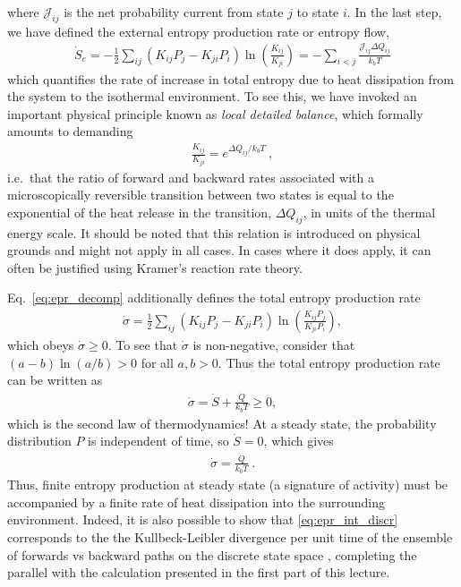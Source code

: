 %
where $\mathcal J_{ij}$ is the net probability current from state $j$ to state $i$.
In the last step, we have defined the external entropy production rate or entropy flow,
%
\begin{align}
    \dot S_e = - \frac{1}{2}\sum_{ij}
        ( K_{ij}P_j - K_{ji} P_i) 
    \ln \left( \frac{K_{ij}}{K_{ji}}\right) = - \sum_{i<j} \frac{\mathcal J_{ij} \Delta Q_{ij}}{k_b T}
\end{align}
%
which quantifies the rate of increase in total entropy due to heat dissipation from the system to the isothermal environment. To see this, we have invoked an important physical principle known as \emph{local detailed balance}, which formally amounts to demanding 
\begin{align}
    \frac{K_{ij}}{K_{ji}} = e^{\Delta Q_{ij} / k_b T}~,
\end{align}
i.e.\ that the ratio of forward and backward rates associated with a microscopically reversible transition between two states is equal to the exponential of the heat release in the transition, $\Delta Q_{ij}$, in units of the thermal energy scale. It should be noted that this relation is introduced on physical grounds and might not apply in all cases. In cases where it does apply, it can often be justified using Kramer's reaction rate theory.

Eq.~\eqref{eq:epr_decomp} additionally defines the total entropy production rate
%
\begin{align}
    \dot \sigma = 
    \frac{1}{2}\sum_{ij}
    \left(K_{ij}P_j - K_{ji} P_i\right) 
    \ln \left( \frac{K_{ij}P_j}{K_{ji} P_i}\right), \label{eq:epr_int_discr}
\end{align}
%
which obeys $\dot \sigma \geq 0$. To see that $\dot \sigma$ is non-negative, consider that $(a-b)\ln(a/b) > 0$ for all $a,b>0$.
Thus the total entropy production rate can be written as 
%
\begin{align}
    \dot \sigma = \dot S + \frac{\dot Q}{k_b T} \geq 0,
\end{align}
%
which is the second law of thermodynamics!
At a steady state, the probability distribution $P$ is independent of time, so $\dot S = 0$, which gives
%
\begin{align}
    \dot \sigma = \frac{\dot Q}{k_b T}~.
\end{align}
Thus, finite entropy production at steady state (a signature of activity) must be accompanied by a finite rate of heat dissipation into the surrounding environment.
%
Indeed, it is also possible to show that \eqref{eq:epr_int_discr} corresponds to the the Kullbeck-Leibler divergence per unit time of the ensemble of forwards vs backward paths on the discrete state space \cite{gaspard2004time}, completing the parallel with the calculation presented in the first part of this lecture. 





